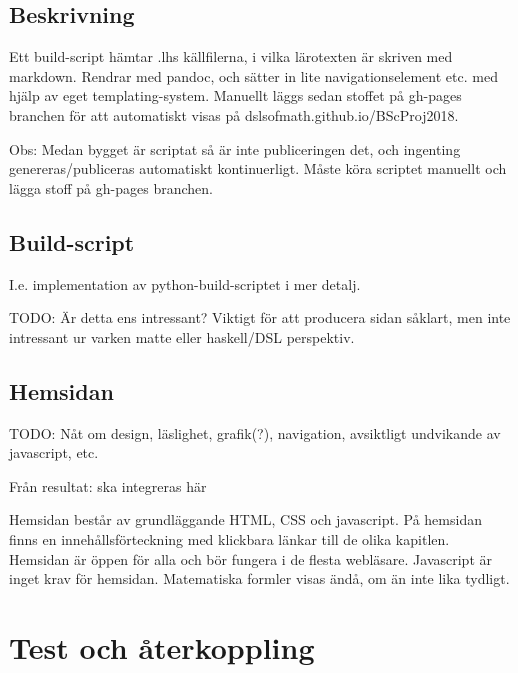 \begin{binge}
  \subsection{Beskrivning}

  Ett build-script hämtar .lhs källfilerna, i vilka lärotexten är
  skriven med markdown. Rendrar med pandoc, och sätter in lite
  navigationselement etc. med hjälp av eget templating-system. Manuellt
  läggs sedan stoffet på gh-pages branchen för att automatiskt visas på
  dslsofmath.github.io/BScProj2018. 

  Obs: Medan bygget är scriptat så är inte publiceringen det, och
  ingenting genereras/publiceras automatiskt kontinuerligt. Måste köra
  scriptet manuellt och lägga stoff på gh-pages branchen.

  \subsection{Build-script}

  I.e. implementation av python-build-scriptet i mer detalj.

  TODO: Är detta ens intressant? Viktigt för att producera sidan såklart, men
  inte intressant ur varken matte eller haskell/DSL perspektiv.

  \subsection{Hemsidan}

  TODO: Nåt om design, läslighet, grafik(?), navigation, avsiktligt undvikande
  av javascript, etc.

Från resultat: ska integreras här

Hemsidan består av grundläggande HTML, CSS och javascript. På hemsidan finns en innehållsförteckning med klickbara länkar till de olika kapitlen. Hemsidan är öppen för alla och bör fungera i de flesta webläsare. Javascript är inget krav för hemsidan. Matematiska formler visas ändå, om än inte lika tydligt.

  \section{Test och återkoppling}



\end{binge}
